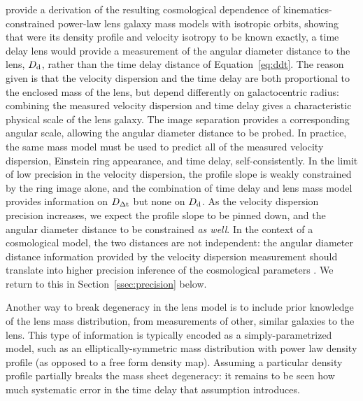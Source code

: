 \citet{JeeKomatsuSuyu2015} provide a derivation of the resulting
cosmological dependence of kinematics-constrained power-law lens galaxy
mass models with isotropic orbits, showing that were its density profile
and velocity isotropy  to be known exactly, a time delay  lens would
provide a measurement of the angular diameter distance to the lens,
$D_{\rm d}$, rather than the time delay distance of Equation~\ref{eq:ddt}. The
reason given is that the velocity dispersion and the time delay  are both
proportional to the enclosed mass of the lens, but  depend differently
on  galactocentric radius: combining the measured velocity dispersion
and time delay gives a characteristic physical scale of the lens galaxy.
The image separation provides a corresponding  angular scale, allowing
the angular diameter distance to be probed.  In practice, the same mass
model must be used to predict all of the measured velocity dispersion,
Einstein ring appearance, and time delay, self-consistently. In the
limit of low precision in the velocity dispersion, the profile slope is weakly
constrained by the ring image alone, and the combination of time delay and
lens mass model provides information on $D_{\Delta{\rm t}}$ but none on $D_{\rm d}$. As the
velocity dispersion precision increases, we expect the profile slope to
be pinned down, and the angular diameter distance to be constrained {\it
as well}. In the context of a cosmological model, the two distances are
not independent: the angular diameter distance information provided
by the velocity dispersion measurement should translate into higher
precision inference of the cosmological parameters \citep{JeeEtal2016}.
We return to this in Section~\ref{ssec:precision} below.

Another way to break degeneracy in the lens model is to include prior knowledge of the
lens mass distribution, from measurements of other, similar galaxies to
the lens. This type of information is typically encoded as a
simply-parametrized model, such as an elliptically-symmetric mass
distribution with power law density profile (as opposed to a free form
density map). Assuming a particular density profile partially breaks the
mass sheet degeneracy: it remains to be seen how much systematic error
in the time delay that assumption introduces.


